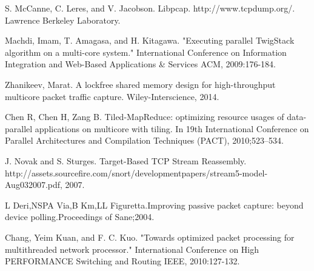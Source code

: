 \documentclass[conference]{IEEEtran}
\begin{document}
\begin{thebibliography}{1}
  S. McCanne, C. Leres, and V. Jacobson. Libpcap. http://www.tcpdump.org/. Lawrence Berkeley Laboratory.
  
  Machdi, Imam, T. Amagasa, and H. Kitagawa. "Executing parallel TwigStack algorithm on a multi-core system." International Conference on Information Integration and Web-Based Applications \& Services ACM, 2009:176-184.
  
  Zhanikeev, Marat. A lockfree shared memory design for high-throughput multicore packet traffic capture. Wiley-Interscience, 2014.
  
  Chen R, Chen H, Zang B. Tiled-MapReduce: optimizing resource usages of data-parallel applications on multicore with tiling. In 19th International Conference on Parallel Architectures and Compilation Techniques (PACT), 2010;523–534.
 
  
  J. Novak and S. Sturges. Target-Based TCP Stream Reassembly. http://assets.sourcefire.com/snort/developmentpapers/stream5-model-Aug032007.pdf, 2007.
  
  L Deri,NSPA Via,B Km,LL Figuretta.Improving passive packet capture: beyond device polling.Proceedings of Sane;2004.
  
  Chang, Yeim Kuan, and F. C. Kuo. "Towards optimized packet processing for multithreaded network processor." International Conference on High PERFORMANCE Switching and Routing IEEE, 2010:127-132.
  
  
\end{thebibliography}



\end{document}
